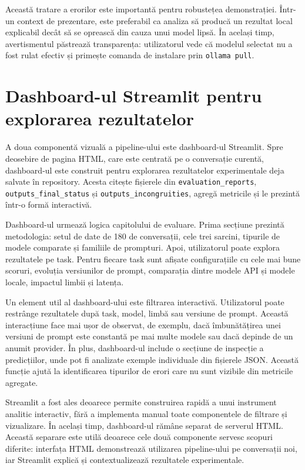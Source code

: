 Această tratare a erorilor este importantă pentru robustețea demonstrației. Într-un context de prezentare, este preferabil ca analiza să producă un rezultat local explicabil decât să se oprească din cauza unui model lipsă. În același timp, avertismentul păstrează transparența: utilizatorul vede că modelul selectat nu a fost rulat efectiv și primește comanda de instalare prin \texttt{ollama pull}.

\section{Dashboard-ul Streamlit pentru explorarea rezultatelor}
\label{sec:demo-pipeline-streamlit}

A doua componentă vizuală a pipeline-ului este dashboard-ul Streamlit. Spre deosebire de pagina HTML, care este centrată pe o conversație curentă, dashboard-ul este construit pentru explorarea rezultatelor experimentale deja salvate în repository. Acesta citește fișierele din \texttt{evaluation\_reports}, \texttt{outputs\_final\_status} și \texttt{outputs\_incongruities}, agregă metricile și le prezintă într-o formă interactivă.

Dashboard-ul urmează logica capitolului de evaluare. Prima secțiune prezintă metodologia: setul de date de 180 de conversații, cele trei sarcini, tipurile de modele comparate și familiile de prompturi. Apoi, utilizatorul poate explora rezultatele pe task. Pentru fiecare task sunt afișate configurațiile cu cele mai bune scoruri, evoluția versiunilor de prompt, comparația dintre modele API și modele locale, impactul limbii și latența.

Un element util al dashboard-ului este filtrarea interactivă. Utilizatorul poate restrânge rezultatele după task, model, limbă sau versiune de prompt. Această interacțiune face mai ușor de observat, de exemplu, dacă îmbunătățirea unei versiuni de prompt este constantă pe mai multe modele sau dacă depinde de un anumit provider. În plus, dashboard-ul include o secțiune de inspecție a predicțiilor, unde pot fi analizate exemple individuale din fișierele JSON. Această funcție ajută la identificarea tipurilor de erori care nu sunt vizibile din metricile agregate.

Streamlit a fost ales deoarece permite construirea rapidă a unui instrument analitic interactiv, fără a implementa manual toate componentele de filtrare și vizualizare. În același timp, dashboard-ul rămâne separat de serverul HTML. Această separare este utilă deoarece cele două componente servesc scopuri diferite: interfața HTML demonstrează utilizarea pipeline-ului pe conversații noi, iar Streamlit explică și contextualizează rezultatele experimentale.

